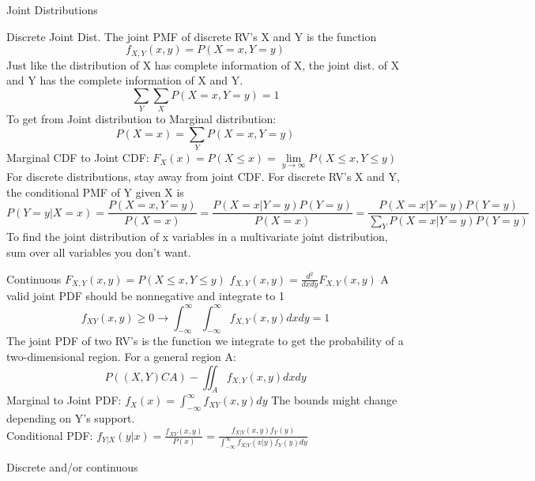 \documentclass[a4paper, 12pt]{article}
\begin{document}
\begin{section}{Joint Distributions}
\begin{subsection}{Discrete Joint Dist.}
The joint PMF of discrete RV's X and Y is the function
\begin{equation} 
f_{X,Y}(x,y)=P(X=x,Y=y)
\end{equation}
Just like the distribution of X has complete information of X, the joint dist. of X and Y has the complete information of X and Y. 
\begin{equation} 
\sum_{Y}\sum_{X}P(X=x,Y=y)=1
\end{equation}
To get from Joint distribution to Marginal distribution:
\begin{equation} 
P(X=x)=\sum_{Y}P(X=x,Y=y)
\end{equation}
Marginal CDF to Joint CDF: $F_{X}(x)=P(X\leq x)=\lim\limits_{y\to\infty}P(X\leq x, Y\leq y)$\\
For discrete distributions, stay away from joint CDF.
For discrete RV's X and Y, the conditional PMF of Y given X is
\begin{equation} 
P(Y=y|X=x)=\frac{P(X=x,Y=y)}{P(X=x)}=\frac{P(X=x|Y=y)P(Y=y)}{P(X=x)}=\frac{P(X=x|Y=y)P(Y=y)}{\sum_{Y}P(X=x|Y=y)P(Y=y)}
\end{equation}
To find the joint distribution of x variables in a multivariate joint distribution, sum over all variables you don't want.
\end{subsection}
\begin{subsection}{Continuous}
$F_{X,Y}(x,y)=P(X\leq x, Y\leq y)$
$f_{X,Y}(x,y)=\frac{d^{2}}{dxdy}F_{X,Y}(x,y)$
A valid joint PDF should be nonnegative and integrate to 1
\begin{equation} 
f_{XY}(x,y)\geq 0\to \int_{-\infty}^{\infty}\int_{-\infty}^{\infty}f_{X,Y}(x,y)
dxdy=1
\end{equation}
The joint PDF of two RV's is the function we integrate to get the probability of a two-dimensional region. For a general region A:
\begin{equation} 
P((X,Y)CA)-\iint_{A}f_{X,Y}(x,y)dxdy
\end{equation}
Marginal to Joint PDF: $f_{X}(x)=\int_{-\infty}^{\infty}f_{XY}(x,y)dy$ The bounds might change depending on Y's support.\\
Conditional PDF: $f_{Y|X}(y|x)=\frac{f_{XY}(x,y)}{P(x)}=\frac{f_{X|Y}(x,y)f_{Y}(y)}{\int_{-\infty}^{\infty}f_{X|Y}(x|y)f_{Y}(y)dy}$
\end{subsection}
\begin{subsection}{Discrete and/or continuous}

\end{subsection}
\end{section}
\end{document}
